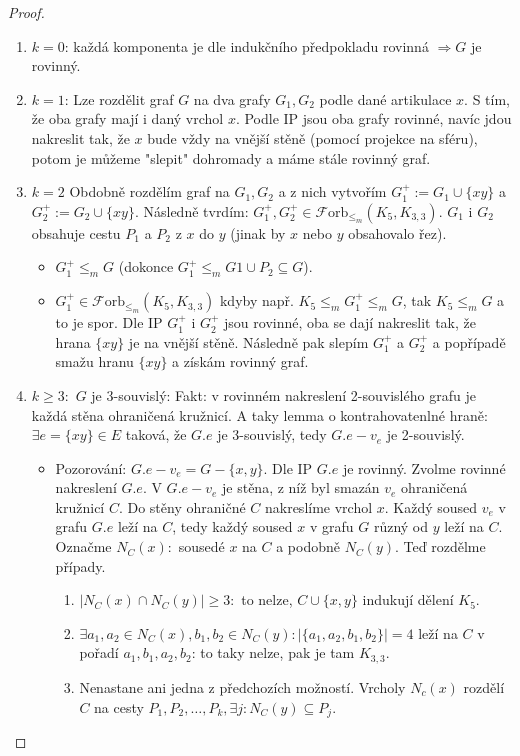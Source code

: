 \begin{proof}
	\begin{enumerate}
		\item $k=0$: každá komponenta je dle indukčního předpokladu rovinná $\Rightarrow G$ je rovinný.
		\item $k=1$: Lze rozdělit graf $G$ na dva grafy $G_{1}, G_{2}$ podle dané artikulace $x$. S tím, že oba grafy mají i daný vrchol $x$. Podle IP jsou oba grafy rovinné, navíc jdou nakreslit tak, že $x$ bude vždy na vnější stěně (pomocí projekce na sféru), potom je můžeme "slepit" dohromady a máme stále rovinný graf.
		\item $k = 2$ Obdobně rozdělím graf na $G_{1}, G_{2}$ a z nich vytvořím $G_{1}^{+}:= G_{1} \cup \{xy\}$ a $G_{2}^{+}:= G_{2} \cup \{xy\}$. Následně tvrdím: $G_{1}^{+}, G_{2}^{+} \in \mathcal{F}\text{orb}_{\leq_{m}}(K_{5},K_{3,3}).$ $G_{1}$ i $G_{2}$ obsahuje cestu $P_{1}$ a $P_{2}$ z $x$ do $y$ (jinak by $x$ nebo $y$ obsahovalo řez).
		\begin{itemize}
			\item $G_{1}^{+} \leq_{m} G$ (dokonce $G_{1}^{+} \leq_{m} G1 \cup P_{2} \subseteq G$).
			\item $G_{1}^{+} \in \mathcal{F}\text{orb}_{\leq_{m}}(K_{5},K_{3,3})$ kdyby např. $K_{5} \leq_{m} G_{1}^{+} \leq_{m} G$, tak $K_{5} \leq_{m} G$ a to je spor. Dle IP $G_{1}^{+}$ i $G_{2}^{+}$ jsou rovinné, oba se dají nakreslit tak, že hrana $\{xy\}$ je na vnější stěně. Následně pak slepím $G_{1}^{+}$ a $G_{2}^{+}$ a popřípadě smažu hranu $\{xy\}$ a získám rovinný graf.
		\end{itemize}
		\item $k \geq 3:$ $G$ je 3-souvislý: Fakt: v rovinném nakreslení 2-souvislého grafu je každá stěna ohraničená kružnicí. A taky lemma o kontrahovatenlné hraně: $\exists e =\{xy\} \in E$ taková, že $G.e$ je 3-souvislý, tedy $G.e - v_{e}$ je 2-souvislý.
		\begin{itemize}
			\item Pozorování: $G.e - v_{e} = G - \{x,y\}$. Dle IP $G.e$ je rovinný. Zvolme rovinné nakreslení $G.e$. V $G.e - v_{e}$ je stěna, z níž byl smazán $v_{e}$ ohraničená kružnicí $C$. Do stěny ohraničné $C$ nakreslíme vrchol $x$. Každý soused $v_{e}$ v grafu $G.e$ leží na $C$, tedy každý soused $x$ v grafu $G$ různý od $y$ leží na $C$. Označme $N_{C}(x):$ sousedé $x$ na $C$ a podobně $N_{C}(y)$. Teď rozdělme případy.
			\begin{enumerate}
				\item $|N_{C}(x) \cap N_{C}(y)| \geq 3:$ to nelze, $C \cup \{x,y\}$ indukují dělení $K_{5}$.
				\item $\exists a_{1},a_{2} \in N_{C}(x), b_{1}, b_{2} \in N_{C}(y): |\{a_{1},a_{2},b_{1},b_{2}\}| = 4$ leží na $C$ v pořadí $a_{1}, b_{1}, a_{2}, b_{2}$: to taky nelze, pak je tam $K_{3,3}$.
				\item Nenastane ani jedna z předchozích možností. Vrcholy $N_{c}(x)$ rozdělí $C$ na cesty $P_{1},P_{2}, \dots, P_{k}, \exists j: N_{C}(y) \subseteq P_{j}$.
			\end{enumerate}
		\end{itemize}
	\end{enumerate}
\end{proof}
